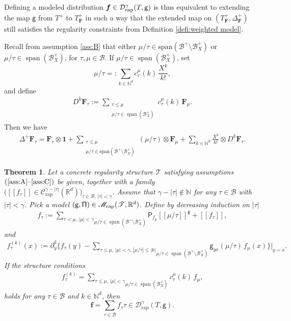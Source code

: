\documentclass[10pt]{amsart}
\DeclareMathOperator{\Span}{span}
\theoremstyle{plain}
\newtheorem{thm}{Theorem}
\theoremstyle{definition}
\newcommand{\unit}{\mathbf{1}}
\newcommand{\Brac}[1]{[\![#1]\!]}
\newcommand{\bsf}{\boldsymbol{f}}
\newcommand{\rap}{\mathrm{rap}}
\newcommand{\sfP}{\mathsf{P}}
\newcommand{\sfg}{\mathsf{g}}
\newcommand{\bsF}{\boldsymbol{F}}
\newcommand{\scrM}{\mathscr{M}}
\newcommand{\scrT}{\mathscr{T}}
\newcommand{\bbN}{\mathbb{N}}
\newcommand{\bbR}{\mathbb{R}}
\newcommand{\mcB}{\mathcal{B}}
\newcommand{\mcC}{\mathcal{C}}
\newcommand{\mcD}{\mathcal{D}}
\begin{document}
Defining a modeled distribution $\bsf\in\mcD_\rap^\gamma(T,\sf g)$ is thus equivalent to extending the map $\sfg$ from $T^+$ to $T_{\bsF}^+$ in such a way that the extended map on $(T_{\bsF}^+,\Delta^+_{\bsF})$ still satisfies the regularity constraints from Definition \ref{defi:weighted model}.

Recall from assumption \eqref{ass:B} that either $\mu/\tau\in\textrm{span}(\mcB^+\setminus\mcB^+_X)$ or $\mu/\tau\in \Span (\mcB_X^+)$, for $\tau,\mu\in\mcB$.
If $\mu/\tau\in \Span (\mcB_X^+)$, set
\[
\mu/\tau =: \sum_{k\in\bbN^d} c_\tau^\mu(k)\,\frac{X^k}{k!},
\]
and define
\begin{align}\label{eq:k-antiderivative}
D^k\bsF_\tau := \sum_{\substack{\tau\leq \mu \\ \mu/\tau\in\Span (\mcB_X^+)}} c_\tau^\mu(k) \, \bsF_\mu.
\end{align}
Then we have
\begin{align*}
\Delta^+\bsF_\tau = \bsF_\tau\otimes\unit + \sum_{\substack{\tau\leq\mu \\ \mu/\tau\in\textrm{span}(\mcB^+\setminus\mcB^+_X)} }(\mu/\tau)\otimes \bsF_\mu + \sum_{k\in\bbN^d}\frac{X^k}{k!}\otimes D^k\bsF_\tau.
\end{align*}

\begin{thm} \label{thm:PD to MD}
Let a concrete regularity structure $\scrT$ satisfying assumptions $\textup{(\ref{ass:A}--\ref{ass:C})}$ be given, together with a family $\bigl(\Brac{f_\tau}\in\mcC_\rap^{\gamma-|\tau|}(\bbR^d)\bigr)_{\tau\in\mcB,\,\vert\tau\vert<\gamma}$. Assume that $\gamma-|\tau|\notin\bbN$ for any $\tau\in\mcB$ with $|\tau|<\gamma$. Pick a model ${\sf (g,\Pi)}\in\scrM_\rap(\scrT,\bbR^d)$. Define by decreasing induction on $\vert\tau\vert$
\begin{align*}
f_\tau := \underset{\mu/\tau\in\Span (\mcB^+\setminus\mcB^+_X)}{\sum_{\tau<\mu, \,|\mu|<\gamma}} \sfP_{f_\mu}\Brac{\mu/\tau}^\sfg + \Brac{f_\tau},
\end{align*}
and
\begin{align} \label{usual condition on MD}
f_{\tau}^{(k)}(x) := \partial_y^k\bigg\{f_\tau(y) -
\underset{\mu/\tau\in\Span (\mcB^+\setminus\mcB^+_X)}{\sum_{\tau\leq\mu, \,|\mu|<\gamma,\, |\mu/\tau|\le|k|}}
\sfg_{yx}(\mu/\tau)\,f_\mu(x)\bigg\}\Big|_{y=x}.
\end{align}
If the \emph{structure conditions}
\begin{align} \label{structure condition}
f_{\tau}^{(k)} = \underset{\mu/\tau\in\Span (\mcB_X^+)}{\sum_{\tau\leq\mu, \,|\mu|<\gamma}} c_\tau^\mu(k) \, f_\mu,
\end{align}
holds for any $\tau\in\mcB$ and $k\in\bbN^d$, then
\[
\bsf = \sum_{\tau\in\mcB}f_\tau\tau\in\mcD_\rap^{\gamma}(T, \sfg).
\]
\end{thm}
\end{document}
